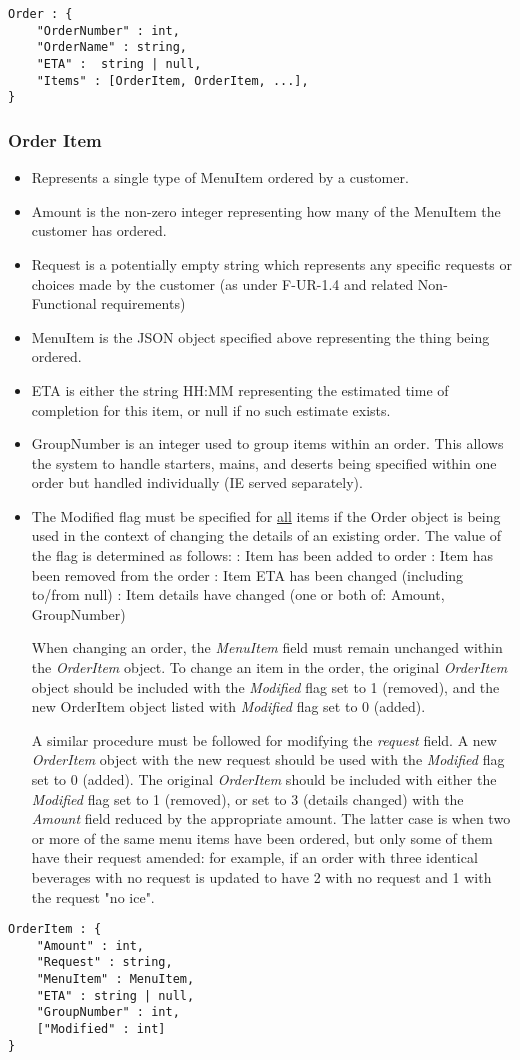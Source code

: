 \documentclass[12pt, a4paper]{article}
\begin{document}
\begin{verbatim}
Order : {
	"OrderNumber" : int,
	"OrderName" : string,
	"ETA" :  string | null,
	"Items" : [OrderItem, OrderItem, ...],
}
\end{verbatim}
\pagebreak
\subsubsection{Order Item}\label{subsubsec:OrderItem}

\begin{itemize}
\item Represents a single type of MenuItem ordered by a customer.
\item Amount is the non-zero integer representing how many of the MenuItem the customer has ordered.
\item Request is a potentially empty string which represents any specific requests or choices made by the customer (as under F-UR-1.4 and related Non-Functional requirements)
\item MenuItem is the JSON object specified above representing the thing being ordered.
\item ETA is either the string HH:MM representing the estimated time of completion for this item, or null if no such estimate exists.
\item GroupNumber is an integer used to group items within an order. This allows the system to handle starters, mains, and deserts being specified within one order but handled individually (IE served separately).
\item The Modified flag must be specified for \underline{all} items if the Order object is being used in the context of changing the details of an existing order. The value of the flag is determined as follows:
 : Item has been added to order
 : Item has been removed from the order
 : Item ETA has been changed (including to/from null)
 : Item details have changed (one or both of: Amount, GroupNumber)

When changing an order, the \textit{MenuItem} field must remain unchanged within the \textit{OrderItem} object. To change an item in the order, the original \textit{OrderItem} object should be included with the \textit{Modified} flag set to 1 (removed), and the new OrderItem object listed with \textit{Modified} flag set to 0 (added).

A similar procedure must be followed for modifying the \textit{request} field. A new \textit{OrderItem} object with the new request should be used with the \textit{Modified} flag set to 0 (added). The original \textit{OrderItem} should be included with either the \textit{Modified} flag set to 1 (removed), or set to 3 (details changed) with the \textit{Amount} field reduced by the appropriate amount. The latter case is when two or more of the same menu items have been ordered, but only some of them have their request amended: for example, if an order with three identical beverages with no request is updated to have 2 with no request and 1 with the request "no ice".

\end{itemize}

\begin{verbatim}
OrderItem : {
	"Amount" : int,
	"Request" : string,
	"MenuItem" : MenuItem,
	"ETA" : string | null,
	"GroupNumber" : int,
	["Modified" : int]
}
\end{verbatim}
\end{document}

